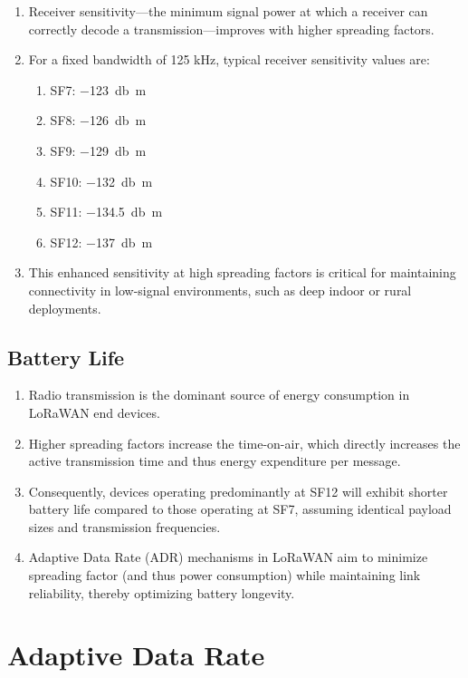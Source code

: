 \begin{enumerate}
    \item Receiver sensitivity—the minimum signal power at which a receiver can correctly decode a transmission—improves with higher spreading factors.
    \item For a fixed bandwidth of 125 kHz, typical receiver sensitivity values are:
          \begin{enumerate}
              \item SF7: \SI{-123}{\decibel m}
              \item SF8: \SI{-126}{\decibel m}
              \item SF9: \SI{-129}{\decibel m}
              \item SF10: \SI{-132}{\decibel m}
              \item SF11: \SI{-134.5}{\decibel m}
              \item SF12: \SI{-137}{\decibel m}
          \end{enumerate}
    \item This enhanced sensitivity at high spreading factors is critical for maintaining connectivity in low-signal environments, such as deep indoor or rural deployments.
\end{enumerate}

\subsection{Battery Life}

\begin{enumerate}
    \item Radio transmission is the dominant source of energy consumption in LoRaWAN end devices.
    \item Higher spreading factors increase the time-on-air, which directly increases the active transmission time and thus energy expenditure per message.
    \item Consequently, devices operating predominantly at SF12 will exhibit shorter battery life compared to those operating at SF7, assuming identical payload sizes and transmission frequencies.
    \item Adaptive Data Rate (ADR) mechanisms in LoRaWAN aim to minimize spreading factor (and thus power consumption) while maintaining link reliability, thereby optimizing battery longevity.
\end{enumerate}

\section{Adaptive Data Rate}

